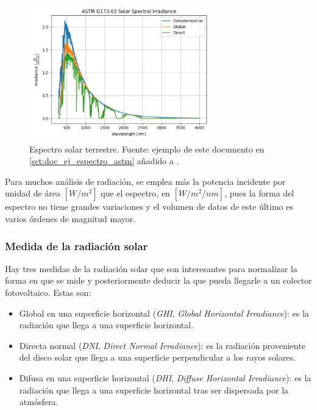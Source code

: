\begin{figure}[H]
      \centering
      \includegraphics[width=0.7\textwidth]{./images/SoA_irrad/astm_g173-03.png}
      \caption{Espectro solar terrestre. Fuente: ejemplo de este documento en \ref{sct:doc_ej_espectro_astm} añadido a \pvlibpy{}.}
      \label{fig:solar_spectrum}
\end{figure}

Para muchos análisis de radiación, se emplea más la potencia incidente por unidad de área $[W/m^2]$ que el espectro, en $[W/m^2/nm]$, pues la forma del espectro no tiene grandes variaciones y el volumen de datos de este último es varios órdenes de magnitud mayor.

\subsubsection{Medida de la radiación solar}

Hay tres medidas de la radiación solar que son interesantes para normalizar la forma en que se mide y posteriormente deducir la que pueda llegarle a un colector fotovoltaico. Estas son:

\begin{itemize}
      \item Global en una superficie horizontal (\textit{\gls{GHI}}, \textit{Global Horizontal Irradiance}): es la radiación que llega a una superficie horizontal.
      \item Directa normal (\textit{\gls{DNI}}, \textit{Direct Normal Irradiance}): es la radiación proveniente del disco solar que llega a una superficie perpendicular a los rayos solares.
      \item Difusa en una superficie horizontal (\textit{\gls{DHI}}, \textit{Diffuse Horizontal Irradiance}): es la radiación que llega a una superficie horizontal tras ser dispersada por la atmósfera.
\end{itemize}

